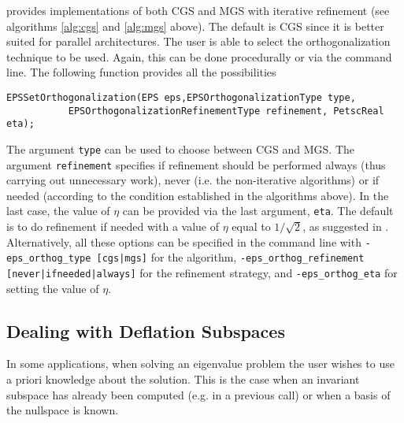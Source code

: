 	\slepc provides implementations of both CGS and MGS with iterative refinement (see algorithms \ref{alg:cgs} and \ref{alg:mgs} above). The default is CGS since it is better suited for parallel architectures. The user is able to select the orthogonalization technique to be used. Again, this can be done procedurally or via the command line. The following function provides all the possibilities
	\begin{Verbatim}[fontsize=\small]
	EPSSetOrthogonalization(EPS eps,EPSOrthogonalizationType type,
           EPSOrthogonalizationRefinementType refinement, PetscReal eta);
	\end{Verbatim}
The argument \Verb!type! can be used to choose between CGS and MGS. The argument \Verb!refinement! specifies if refinement should be performed always (thus carrying out unnecessary work), never (i.e. the non-iterative algorithms) or if needed (according to the condition established in the algorithms above). In the last case, the value of $\eta$ can be provided via the last argument, \Verb!eta!. The default is to do refinement if needed with a value of $\eta$ equal to $1/\sqrt{2}$, as suggested in \citep{Reichel:1990:FSU}. Alternatively, all these options can be specified in the command line with \Verb!-eps_orthog_type [cgs|mgs]! for the algorithm, \Verb!-eps_orthog_refinement! \Verb! [never|ifneeded|always]! for the refinement strategy, and \Verb!-eps_orthog_eta! for setting the value of $\eta$.


\subsection{Dealing with Deflation Subspaces}

	In some applications, when solving an eigenvalue problem the user wishes to use a priori knowledge about the solution. This is the case when an invariant subspace has already been computed (e.g. in a previous  call) or when a basis of the nullspace is known.

